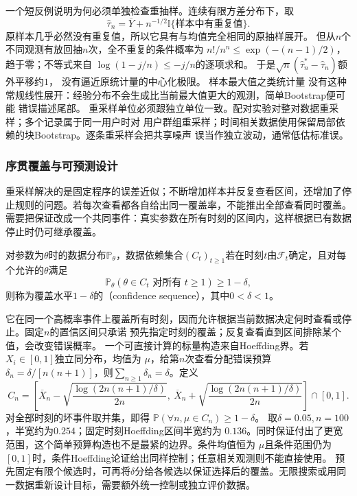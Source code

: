 一个短反例说明为何必须单独检查重抽样。连续有限方差分布下，取
\[
 \widehat\tau_n=\overline Y+n^{-1/2}
 \mathbb I\{\text{样本中有重复值}\}.
\]
原样本几乎必然没有重复值，所以它具有与均值完全相同的原抽样展开。
但从\(n\)个不同观测有放回抽\(n\)次，全不重复的条件概率为
\(n!/n^n\leq\exp(-(n-1)/2)\)，趋于零；不等式来自
\(\log(1-j/n)\leq-j/n\)的逐项求和。
于是\(\sqrt n(\widehat\tau_n^\ast-\widehat\tau_n)\)额外平移约\(1\)，
没有逼近原统计量的中心化极限。
样本最大值之类统计量
没有这种常规线性展开：经验分布不会生成比当前最大值更大的观测，简单Bootstrap便可能
错误描述尾部。
重采样单位必须跟独立单位一致。配对实验对整对数据重采样；多个记录属于同一用户时对
用户群组重采样；时间相关数据使用保留局部依赖的块Bootstrap。逐条重采样会把共享噪声
误当作独立波动，通常低估标准误。
\subsubsection{序贯覆盖与可预测设计}
重采样解决的是固定程序的误差近似；不断增加样本并反复查看区间，还增加了停止规则的问题。若每次查看都各自给出同一覆盖率，不能推出全部查看同时覆盖。需要把保证改成一个共同事件：真实参数在所有时刻的区间内，这样根据已有数据停止时仍可继承覆盖。
\begin{definition}[置信序列]
  \label{def:stoch-confidence-sequence}
  对参数为\(\theta\)时的数据分布\(\mathbb P_\theta\)，数据依赖集合\((C_t)_{t\geq1}\)若在时刻\(t\)由\(\mathcal F_t\)确定，且对每个允许的\(\theta\)满足
  \[ \mathbb P_\theta(\theta\in C_t\text{ 对所有 }t\geq1)\geq1-\delta, \]
  则称为覆盖水平\(1-\delta\)的（confidence sequence），其中\(0<\delta<1\)。
\end{definition}
它在同一个高概率事件上覆盖所有时刻，因而允许根据当前数据决定何时查看或停止。固定$n$的置信区间只承诺
预先指定时刻的覆盖；反复查看直到区间排除某个值，会改变错误概率。
一个可直接计算的标量构造来自Hoeffding界。若\(X_i\in[0,1]\)独立同分布，均值为
\(\mu\)，给第\(n\)次查看分配错误预算
\(\delta_n=\delta/[n(n+1)]\)，则\(\sum_{n\geq1}\delta_n=\delta\)。定义
\[
C_n=\left[\overline X_n-
\sqrt{\frac{\log(2n(n+1)/\delta)}{2n}},
\ \overline X_n+
\sqrt{\frac{\log(2n(n+1)/\delta)}{2n}}\right]\cap[0,1].
\]
对全部时刻的坏事件取并集，即得
\(\mathbb P(\forall n,\mu\in C_n)\geq1-\delta\)。
取\(\delta=0.05,n=100\)，半宽约为\(0.254\)；固定时刻Hoeffding区间半宽约为
\(0.136\)。同时保证付出了更宽范围，这个简单预算构造也不是最紧的边界。条件均值恒为
\(\mu\)且条件范围仍为\([0,1]\)时，条件Hoeffding论证给出同样控制；任意相关观测则不能直接使用。
预先固定有限个候选时，可再将\(\delta\)分给各候选以保证选择后的覆盖。无限搜索或用同一数据重新设计目标，需要额外统一控制或独立评价数据。

